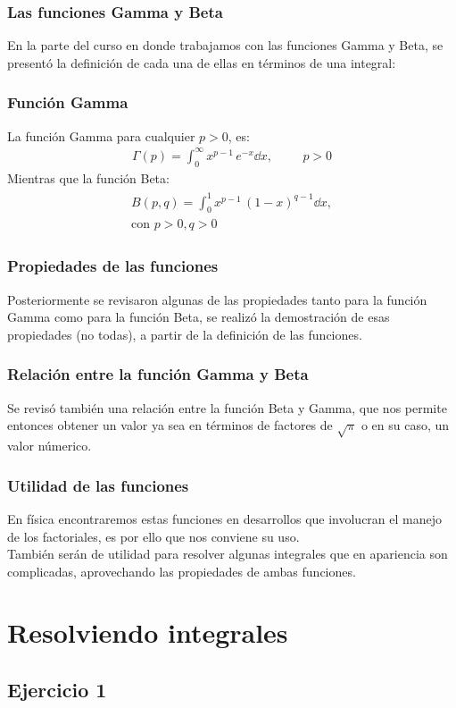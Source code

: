 \begin{frame}
\frametitle{Las funciones Gamma y Beta}
En la parte del curso en donde trabajamos con las funciones Gamma y Beta, se presentó la definición de cada una de ellas en términos de una integral:
\end{frame}
\begin{frame}
\frametitle{Función Gamma}
La función Gamma para cualquier $p >0$, es:
\begin{align*}
\Gamma (p) = \int_{0}^{\infty} x^{p-1} \, e^{-x} \dd{x}, \hspace{1cm} p > 0
\end{align*}
\pause
Mientras que la función Beta: 
\begin{align*}
\begin{gathered}
B(p, q) = \int_{0}^{1} x^{p-1} \, (1- x )^{q-1} \dd{x}, \\
\mbox{con }  p > 0, q > 0
\end{gathered}
\end{align*}
\end{frame}
\begin{frame}
\frametitle{Propiedades de las funciones}
Posteriormente se revisaron algunas de las propiedades tanto para la función Gamma como para la función Beta, se realizó la demostración de esas propiedades (no todas), a partir de la definición de las funciones.
\end{frame}
\begin{frame}
\frametitle{Relación entre la función Gamma y Beta}
Se revisó también una relación entre la función Beta y Gamma, que nos permite entonces obtener un valor ya sea en términos de factores de $\sqrt{\pi}$ o en su caso, un valor númerico.
\end{frame}
\begin{frame}
\frametitle{Utilidad de las funciones}
En física encontraremos estas funciones en desarrollos que involucran el manejo de los factoriales, es por ello que nos conviene su uso.
\\
\bigskip
\pause
También serán de utilidad para resolver algunas integrales que en apariencia son complicadas, aprovechando las propiedades de ambas funciones.
\end{frame}

\section{Resolviendo integrales}
\subsection{Ejercicio 1}


